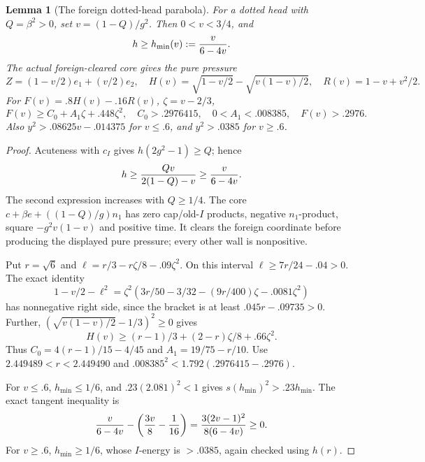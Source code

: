 \documentclass[11pt]{article}
\newtheorem{lemma}[theorem]{Lemma}
\theoremstyle{definition}
\theoremstyle{remark}
\begin{document}
\begin{lemma}[The foreign dotted-head parabola]
\label{lem:I-foreign-head-parabola}
For a dotted head with \(Q=\beta^2>0\), set \(v=(1-Q)/g^2\).
Then \(0<v<3/4\), and
\[
 h\ge h_{\min}(v):={v\over6-4v}.
\]
The actual foreign-cleared core gives the pure pressure
\[
 Z=(1-v/2)e_1+(v/2)e_2,\quad
 H(v)=\sqrt{1-v/2}-\sqrt{v(1-v)/2},\quad
 R(v)=1-v+v^2/2.
\]
For \(F(v)=.8H(v)-.16R(v)\), \(\zeta=v-2/3\),
\[
 F(v)\ge C_0+A_1\zeta+.448\zeta^2,\quad
 C_0>.2976415,\quad0<A_1<.008385,\quad F(v)>.2976.
\]
Also \(y^2>.08625v-.014375\) for \(v\le.6\), and
\(y^2>.0385\) for \(v\ge.6\).
\end{lemma}
\begin{proof}
Acuteness with \(c_I\) gives \(h(2g^2-1)\ge Q\); hence
\[
 h\ge{Qv\over2(1-Q)-v}\ge{v\over6-4v}.
\]
The second expression increases with \(Q\ge1/4\).
The core \(c+\beta e+((1-Q)/g)n_1\) has zero cap/old-\(I\)
products, negative \(n_1\)-product, square \(-g^2v(1-v)\)
and positive time. It clears the foreign coordinate before producing
the displayed pure pressure; every other wall is nonpositive.

Put \(r=\sqrt6\) and \(\ell=r/3-r\zeta/8-.09\zeta^2\).
On this interval \(\ell\ge7r/24-.04>0\).
The exact identity
\[
 1-v/2-\ell^2
 =\zeta^2(3r/50-3/32-(9r/400)\zeta-.0081\zeta^2)
\]
has nonnegative right side, since the bracket is at least
\(.045r-.09735>0\). Further,
\((\sqrt{v(1-v)/2}-1/3)^2\ge0\) gives
\[
 H(v)\ge(r-1)/3+(2-r)\zeta/8+.66\zeta^2.
\]
Thus \(C_0=4(r-1)/15-4/45\) and
\(A_1=19/75-r/10\). Use
\(2.449489<r<2.449490\) and
\(.008385^2<1.792(.2976415-.2976)\).

For \(v\le.6\), \(h_{\min}\le1/6\), and
\(.23(2.081)^2<1\) gives \(s(h_{\min})^2>.23h_{\min}\).
The exact tangent inequality is
\[
 {v\over6-4v}-\left({3v\over8}-{1\over16}\right)
 ={3(2v-1)^2\over8(6-4v)}\ge0.
\]
For \(v\ge.6\), \(h_{\min}\ge1/6\), whose \(I\)-energy is
\(>.0385\), again checked using \(h(r)\).
\end{proof}
\end{document}
